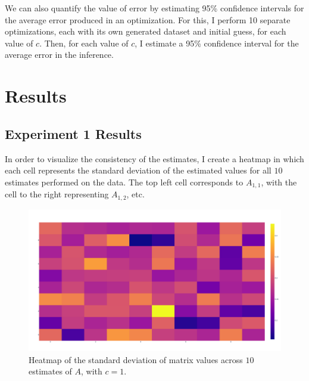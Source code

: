 \documentclass{article}
\theoremstyle{definition}
\begin{document}
We can also quantify the value of error by estimating 95\% confidence intervals for the average error produced in an optimization. For this, I perform 10 separate optimizations, each with its own generated dataset and initial guess, for each value of $c$. Then, for each value of $c$, I estimate a 95\% confidence interval for the average error in the inference.



\section{Results}
\label{sec:results}

\subsection{Experiment 1 Results}
\label{subsec:Exper1Results}

In order to visualize the consistency of the estimates, I create a heatmap in which each cell represents the standard deviation of the estimated values for all $10$ estimates performed on the data. The top left cell corresponds to $A_{1, 1}$, with the cell to the right representing $A_{1, 2}$, etc. 

\newpage

\begin{figure}[hbt!]
    \par
    \begin{center}
    \caption{Heatmap of the standard deviation of matrix values across $10$ estimates of $A$, with $c=1$. }
    \label{fig:heatmapSD}
    \includegraphics[scale=0.1]{Figures/heatmap_sd_guesses.png}
    \end{center}
    \par
    \vspace{-0.25in}
    \medskip
\end{figure}
\end{document}
